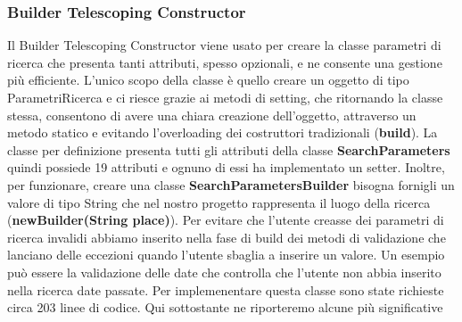 \documentclass[10pt]{article}
\begin{document}
\subsubsection{Builder Telescoping Constructor}

Il Builder Telescoping Constructor viene usato per creare la classe parametri di ricerca che presenta tanti attributi, spesso opzionali, e ne consente una gestione più efficiente. L'unico scopo della classe è quello creare un oggetto di tipo ParametriRicerca e ci riesce grazie ai metodi di setting, che ritornando la classe stessa, consentono di avere una chiara creazione dell'oggetto, attraverso un metodo statico e evitando l'overloading dei costruttori tradizionali (\textbf{build}). La classe per definizione presenta tutti gli attributi della classe \textbf{SearchParameters} quindi possiede 19 attributi e ognuno di essi ha implementato un setter. Inoltre, per funzionare, creare una classe \textbf{SearchParametersBuilder} bisogna fornigli un valore di tipo String che nel nostro progetto rappresenta il luogo della ricerca (\textbf{newBuilder(String place)}). Per evitare che l'utente creasse dei parametri di ricerca invalidi abbiamo inserito nella fase di build dei metodi di validazione che lanciano delle eccezioni quando l'utente sbaglia a inserire un valore. Un esempio può essere la validazione delle date che controlla che l'utente non abbia inserito nella ricerca date passate.
Per implemenentare questa classe sono state richieste circa 203 linee di codice. Qui sottostante ne riporteremo alcune più significative
\newpage
\UseRawInputEncoding
\end{document}
